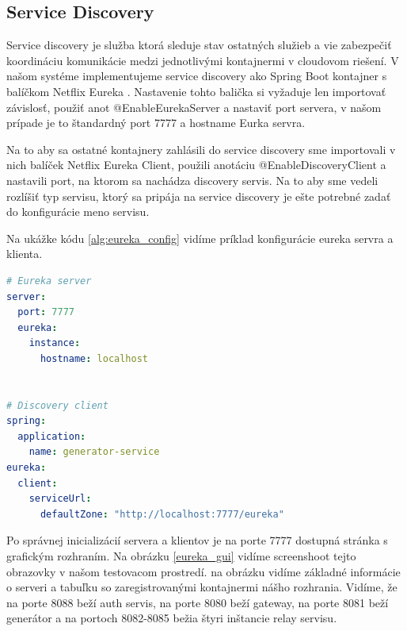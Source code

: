 \subsection{Service Discovery}
Service discovery je služba ktorá sleduje stav ostatných služieb a vie zabezpečiť koordináciu komunikácie medzi jednotlivými kontajnermi v cloudovom riešení. V našom systéme implementujeme service discovery ako Spring Boot kontajner s balíčkom Netflix Eureka \cite{eureka}. Nastavenie tohto balička si vyžaduje len importovať závislosť, použiť anot @EnableEurekaServer a nastaviť port servera, v našom prípade je to štandardný port 7777 a hostname Eurka servra.

Na to aby sa ostatné kontajnery zahlásili do service discovery sme importovali v nich balíček Netflix Eureka Client, použili anotáciu @EnableDiscoveryClient a nastavili port, na ktorom sa nachádza discovery servis. Na to aby sme vedeli rozlíšiť typ servisu, ktorý sa pripája na service discovery je ešte potrebné zadať do konfigurácie meno servisu.

Na ukážke kódu \ref{alg:eureka_config} vidíme príklad konfigurácie eureka servra a klienta.

\begin{lstlisting}[float, caption={Konfigurácia Eureka servra a klienta},label={alg:eureka_config},language=yaml]
# Eureka server
server:
  port: 7777
  eureka:
	instance:
	  hostname: localhost
			

# Discovery client	
spring:
  application:
	name: generator-service
eureka:
  client:
	serviceUrl:
	  defaultZone: "http://localhost:7777/eureka"
\end{lstlisting}

Po správnej inicializácií servera a klientov je na porte 7777 dostupná stránka s grafickým rozhraním. Na obrázku \ref{eureka_gui} vidíme screenshoot tejto obrazovky v našom testovacom prostredí. na obrázku vidíme základné informácie o serveri a tabuľku so zaregistrovanými kontajnermi nášho rozhrania. Vidíme, že na porte 8088 beží auth servis, na porte 8080 beží gateway, na porte 8081 beží generátor a na portoch 8082-8085 bežia štyri inštancie relay servisu.

